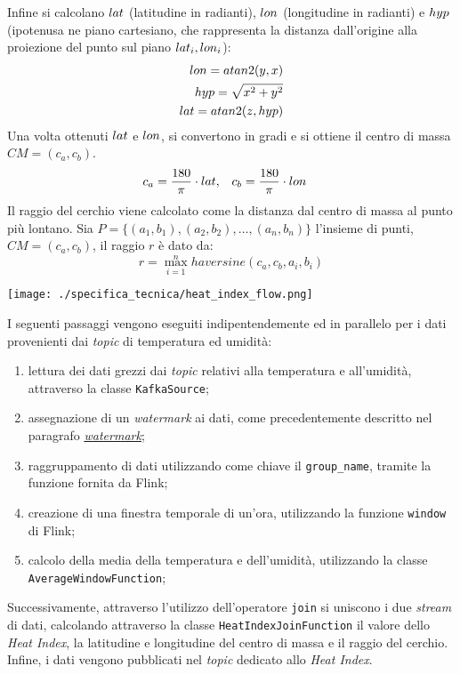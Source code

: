 Infine si calcolano ${lat}$ (latitudine in radianti), ${lon}$ (longitudine in radianti) e ${hyp}$ (ipotenusa ne piano cartesiano, che rappresenta la distanza dall'origine alla proiezione del punto sul piano ${lat}_i, {lon}_i$):
\begin{align*}
	{lon} = {atan2}(y, x) \\
	{hyp} = \sqrt{x^2 + y^2}     \\
	{lat} = {atan2}(z, {hyp})
\end{align*}
Una volta ottenuti ${lat}$ e ${lon}$, si convertono in gradi e si ottiene il centro di massa $CM = (c_a, c_b)$.
\begin{align*}
	c_a = \frac{180}{\pi} \cdot {lat}, & \quad c_b = \frac{180}{\pi} \cdot {lon}
\end{align*}
Il raggio del cerchio viene calcolato come la distanza dal centro di massa al punto più lontano. Sia $P = \{(a_1, b_1), (a_2, b_2), \ldots, (a_n, b_n)\}$ l'insieme di punti, $CM = (c_a, c_b)$, il
raggio $r$ è dato da:
\[
	r = \max_{i=1}^{n} haversine(c_a, c_b, a_i, b_i)
\]


\begin{center}
	\texttt{[image: ./specifica\_tecnica/heat\_index\_flow.png]}
\end{center}
I seguenti passaggi vengono eseguiti indipentendemente ed in parallelo per i dati provenienti dai \textit{topic} di temperatura ed umidità:
\begin{enumerate}
	\item lettura dei dati grezzi dai \textit{topic} relativi alla temperatura e all'umidità, attraverso la classe \texttt{KafkaSource};
	\item assegnazione di un \textit{watermark} ai dati, come precedentemente descritto nel paragrafo \hyperref[watermark]{\underline{\textit{watermark}}};
	\item raggruppamento di dati utilizzando come chiave il \texttt{group\_name}, tramite la funzione \texttt{} fornita da Flink;
	\item creazione di una finestra temporale di un'ora, utilizzando la funzione \texttt{window} di Flink;
	\item calcolo della media della temperatura e dell'umidità, utilizzando la classe \\\texttt{AverageWindowFunction};
\end{enumerate}
Successivamente, attraverso l'utilizzo dell'operatore \texttt{join} si uniscono i due \textit{stream} di dati, calcolando
attraverso la classe \texttt{HeatIndexJoinFunction} il valore dello \textit{Heat Index}, la latitudine e longitudine del centro di massa e il raggio del cerchio.
Infine, i dati vengono pubblicati nel \textit{topic} dedicato allo \textit{Heat Index}.

